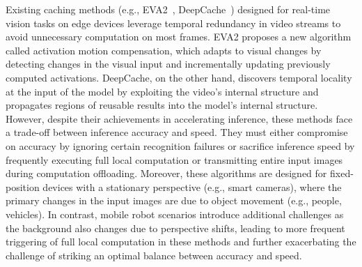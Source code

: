 Existing caching methods (e.g., EVA2~\cite{cavigelli_cbinfer_2017}, DeepCache~\cite{xu2018deepcache}) designed for real-time vision tasks on edge devices leverage temporal redundancy in video streams to avoid unnecessary computation on most frames. 
EVA2 proposes a new algorithm called activation motion compensation, which adapts to visual changes by detecting changes in the visual input and incrementally updating previously computed activations. 
DeepCache, on the other hand, discovers temporal locality at the input of the model by exploiting the video's internal structure and propagates regions of reusable results into the model's internal structure. 
However, despite their achievements in accelerating inference, these methods face a trade-off between inference accuracy and speed. 
They must either compromise on accuracy by ignoring certain recognition failures or sacrifice inference speed by frequently executing full local computation or transmitting entire input images during computation offloading.
Moreover, these algorithms are designed for fixed-position devices with a stationary perspective (e.g., smart cameras), where the primary changes in the input images are due to object movement (e.g., people, vehicles). 
In contrast, mobile robot scenarios introduce additional challenges as the background also changes due to perspective shifts, leading to more frequent triggering of full local computation in these methods and further exacerbating the challenge of striking an optimal balance between accuracy and speed.

